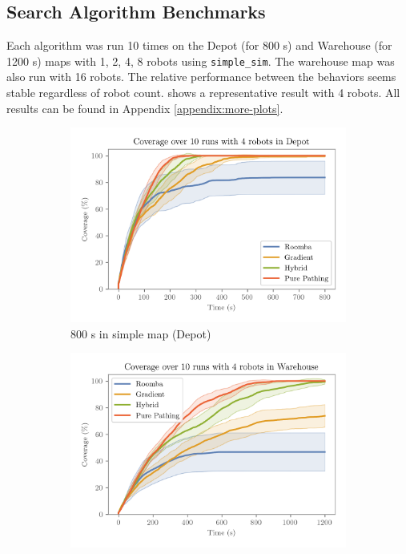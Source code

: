 \subsection{Search Algorithm Benchmarks}
\label{sec:search-algorithms-benchmark}
Each algorithm was run 10 times on the Depot (for 800 s) and Warehouse (for 1200 s) maps with 1, 2, 4, 8 robots using \texttt{simple\_sim}. The warehouse map was also run with 16 robots. The relative performance between the behaviors seems stable regardless of robot count.  shows a representative result with 4 robots. All results can be found in Appendix \ref{appendix:more-plots}. 

\begin{figure}[H]
  \centering
  \begin{subfigure}[b]{0.49\textwidth}
    \centering
    \includegraphics[width=\textwidth]{./figures/plots/benchmarks/coverage-over-10-runs-with-4-robots-in-depot.png}
      \caption{800 s in simple map (Depot)}
  \end{subfigure}
  \begin{subfigure}[b]{0.49\textwidth}
    \centering
    \includegraphics[width=\textwidth]{./figures/plots/benchmarks/coverage-over-10-runs-with-4-robots-in-warehouse.png}

\end{subfigure}
\end{figure}
